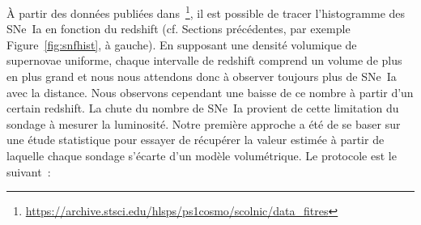 \documentclass[../main/main.tex]{subfiles}
\begin{document}
À partir des données publiées dans~\cite{scolnic2018}\footnote{\href{
    https://archive.stsci.edu/hlsps/ps1cosmo/scolnic/data_fitres/}
{https://archive.stsci.edu/hlsps/ps1cosmo/scolnic/data\_fitres}}, il est
possible de tracer l'histogramme des SNe~Ia en fonction du redshift (cf.
Sections précédentes, par exemple Figure~\ref{fig:snfhist}, à gauche). En
supposant une densité volumique de supernovae uniforme, chaque intervalle de
redshift comprend un volume de plus en plus grand et nous nous attendons donc à
observer toujours plus de SNe~Ia avec la distance. Nous observons cependant une
baisse de ce nombre à partir d'un certain redshift. La chute du nombre de SNe~Ia
provient de cette limitation du sondage à mesurer la luminosité. Notre première
approche a été de se baser sur une étude statistique pour essayer de récupérer
la valeur estimée à partir de laquelle chaque sondage s'écarte d'un modèle
volumétrique. Le protocole est le suivant~:
\end{document}
